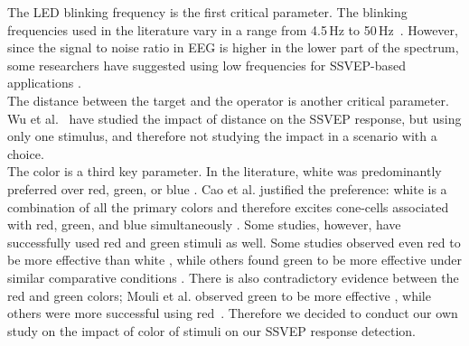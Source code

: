 \documentclass[smallextended]{svjour3}
\begin{document}
The LED blinking frequency is the first critical parameter. The blinking frequencies used in the literature vary in a range from 4.5\,Hz to 50\,Hz~\cite{Zhu2010}. However, since the signal to noise ratio in EEG is higher in the lower part of the spectrum, some researchers have suggested using low frequencies for SSVEP-based applications \cite{paper6}.\\
The distance between the target and the operator is another critical parameter. Wu et al.~\cite{wu2013effect} have studied the impact of distance on the SSVEP response, but using only one stimulus, and therefore not studying the impact in a scenario with a choice.\\
The color is a third key parameter. In the literature, white was predominantly preferred over red, green, or blue \cite{paper6,aljshamee2014beyond,aljshamee2016discriminate,cao2012flashing,paper2}. Cao et al. justified the preference: white is a combination of all the primary colors and therefore excites cone-cells associated with red, green, and blue simultaneously \cite{cao2012flashing}. 
Some studies, however, have successfully used red \cite{Faller2010,jian2014improving,paper4} and green \cite{chua2004effects,duvinage2013performance,SSVEPfiability,hvaring2014comparison,paper4,mouli2013performance} stimuli as well. Some studies observed even red to be more effective than white \cite{Faller2010,hvaring2014comparison}, while others found green to be more effective under similar comparative conditions \cite{chua2004effects,duvinage2013performance}. 
There is also contradictory evidence between the red and green colors; Mouli et al. observed green to be more effective \cite{mouli2013performance}, while others were more successful using red~\cite{cao2012flashing}. Therefore we decided to conduct our own study on the impact of color of stimuli on our SSVEP response detection.


\end{document}
